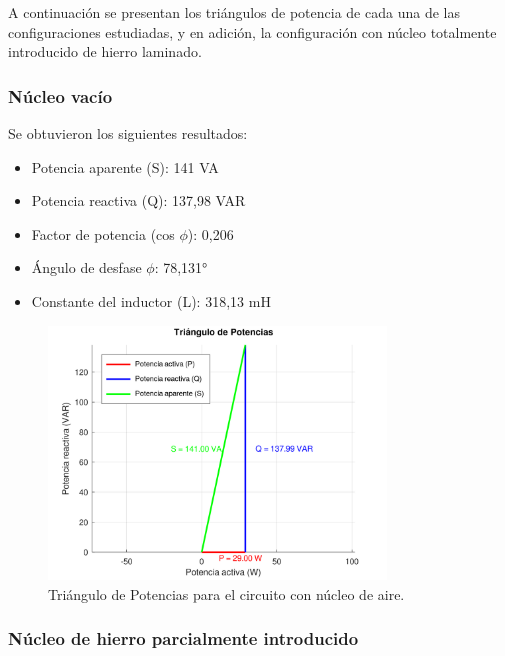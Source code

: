 \documentclass{article}
\begin{document}
                    A continuación se presentan los triángulos de potencia de cada una de las configuraciones estudiadas, y en adición,
                    la configuración con núcleo totalmente introducido de hierro laminado. 

                    \subsubsection{Núcleo vacío}
                        Se obtuvieron los siguientes resultados:
                        \begin{itemize}
                            \item Potencia aparente (S): 141 VA
                            \item Potencia reactiva (Q): 137,98 VAR
                            \item Factor de potencia (cos $\phi$): 0,206
                            \item Ángulo de desfase $\phi$: 78,131°
                            \item Constante del inductor (L): 318,13 mH
                        \end{itemize}

                        \begin{figure}[H]
                            \centering
                            \includegraphics[width=0.8\textwidth]{graficoAire.png}
                            \caption{Triángulo de Potencias para el circuito con núcleo de aire.}
                            \label{fig:graficoAire}
                        \end{figure}
                    
                    \subsubsection{Núcleo de hierro parcialmente introducido}
                        
\end{document}
